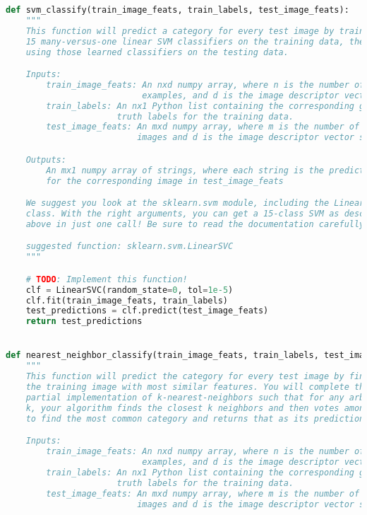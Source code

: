 \begin{lstlisting}[caption={student.py}, label={l:code-example}, captionpos=t, language=python]
def svm_classify(train_image_feats, train_labels, test_image_feats):
    """
    This function will predict a category for every test image by training
    15 many-versus-one linear SVM classifiers on the training data, then
    using those learned classifiers on the testing data.

    Inputs:
        train_image_feats: An nxd numpy array, where n is the number of training
                           examples, and d is the image descriptor vector size.
        train_labels: An nx1 Python list containing the corresponding ground
                      truth labels for the training data.
        test_image_feats: An mxd numpy array, where m is the number of test
                          images and d is the image descriptor vector size.

    Outputs:
        An mx1 numpy array of strings, where each string is the predicted label
        for the corresponding image in test_image_feats

    We suggest you look at the sklearn.svm module, including the LinearSVC
    class. With the right arguments, you can get a 15-class SVM as described
    above in just one call! Be sure to read the documentation carefully.

    suggested function: sklearn.svm.LinearSVC
    """

    # TODO: Implement this function!
    clf = LinearSVC(random_state=0, tol=1e-5)
    clf.fit(train_image_feats, train_labels)
    test_predictions = clf.predict(test_image_feats)
    return test_predictions


def nearest_neighbor_classify(train_image_feats, train_labels, test_image_feats):
    """
    This function will predict the category for every test image by finding
    the training image with most similar features. You will complete the given
    partial implementation of k-nearest-neighbors such that for any arbitrary
    k, your algorithm finds the closest k neighbors and then votes among them
    to find the most common category and returns that as its prediction.

    Inputs:
        train_image_feats: An nxd numpy array, where n is the number of training
                           examples, and d is the image descriptor vector size.
        train_labels: An nx1 Python list containing the corresponding ground
                      truth labels for the training data.
        test_image_feats: An mxd numpy array, where m is the number of test
                          images and d is the image descriptor vector size.


\end{lstlisting}
